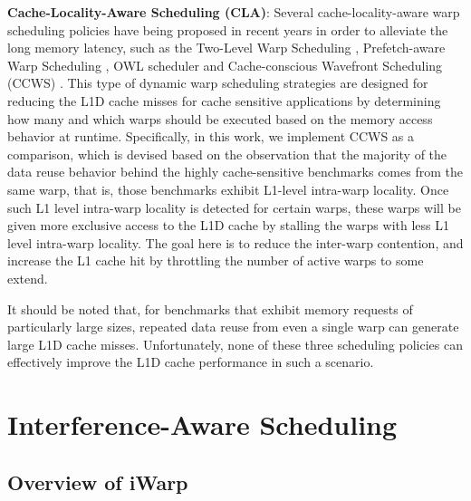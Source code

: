 \documentclass{sigplanconf}
\begin{document}
\noindent\textbf{Cache-Locality-Aware Scheduling (CLA)}: Several cache-locality-aware warp scheduling policies have being proposed in recent years in order to alleviate the long memory latency, such as the Two-Level Warp Scheduling \cite{narasiman2011improving}, Prefetch-aware Warp Scheduling \cite{jog2013orchestrated}, OWL scheduler \cite{jog2013owl} and Cache-conscious Wavefront Scheduling (CCWS) \cite{rogers2012cache}. This type of dynamic warp scheduling strategies are designed for reducing the L1D cache misses for cache sensitive applications by determining how many and which warps should be executed based on the memory access behavior at runtime. Specifically, in this work, we implement CCWS as a comparison, which is devised based on the observation that the majority of the data reuse behavior behind the highly cache-sensitive benchmarks comes from the same warp, that is, those benchmarks exhibit L1-level intra-warp locality. Once such L1 level intra-warp locality is detected for certain warps, these warps will be given more exclusive access to the L1D cache by stalling the warps with less L1 level intra-warp locality. The goal here is to reduce the inter-warp contention, and increase the L1 cache hit by throttling the number of active warps to some extend.

It should be noted that, for benchmarks that exhibit memory requests of particularly large sizes, repeated data reuse from even a single warp can generate large L1D cache misses. Unfortunately, none of these three scheduling policies can effectively improve the L1D cache performance in such a scenario.


\section{Interference-Aware Scheduling}

\subsection{Overview of iWarp}
\end{document}

